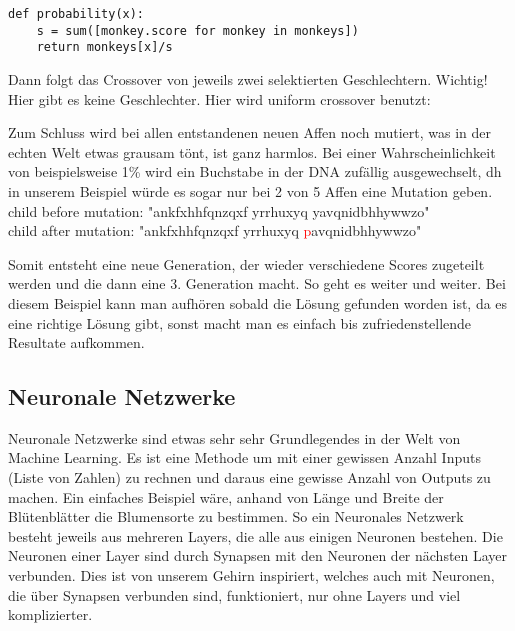 \documentclass[10pt,a4paper,ngerman,english]{article}
\begin{document}
\begin{lstlisting}
def probability(x):
    s = sum([monkey.score for monkey in monkeys])
    return monkeys[x]/s
\end{lstlisting}

Dann folgt das Crossover von jeweils zwei selektierten Geschlechtern. 
Wichtig! Hier gibt es keine Geschlechter. Hier wird uniform crossover benutzt:\\


Zum Schluss wird bei allen entstandenen neuen Affen noch mutiert, was in der echten Welt etwas grausam tönt, ist ganz harmlos. Bei einer Wahrscheinlichkeit von beispielsweise 1\% wird ein Buchstabe in der DNA zufällig ausgewechselt, dh in unserem Beispiel würde es sogar nur bei 2 von 5 Affen eine Mutation geben.\\
child before mutation: "ankfxhhfqnzqxf yrrhuxyq yavqnidbhhywwzo"\\
child after mutation: "ankfxhhfqnzqxf yrrhuxyq \textcolor{red}{p}avqnidbhhywwzo"

Somit entsteht eine neue Generation, der wieder verschiedene Scores zugeteilt werden und die dann eine 3. Generation macht. So geht es weiter und weiter. Bei diesem Beispiel kann man aufhören sobald die Lösung gefunden worden ist, da es eine richtige Lösung gibt, sonst macht man es einfach bis zufriedenstellende Resultate aufkommen.

\subsection{Neuronale Netzwerke}

Neuronale Netzwerke sind etwas sehr sehr Grundlegendes in der Welt von Machine Learning. Es ist eine Methode um mit einer gewissen Anzahl Inputs (Liste von Zahlen) zu rechnen und daraus eine gewisse Anzahl von Outputs zu machen. Ein einfaches Beispiel wäre, anhand von Länge und Breite der Blütenblätter die Blumensorte zu bestimmen. So ein Neuronales Netzwerk besteht jeweils aus mehreren Layers, die alle aus einigen Neuronen bestehen. Die Neuronen einer Layer sind durch Synapsen mit den Neuronen der nächsten Layer verbunden. Dies ist von unserem Gehirn inspiriert, welches auch mit Neuronen, die über Synapsen verbunden sind, funktioniert, nur ohne Layers und viel komplizierter.
\end{document}
